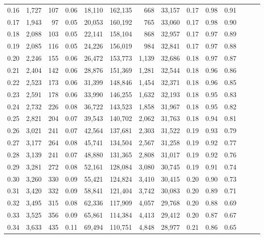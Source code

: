 \begin{tabular}{rrrrrrrrrrrrrr}
0.16 &  1,727 &  107 &  0.06 &   18,110 &  162,135 &     668 &  33,157 &  0.17 &  0.98 &      0.91 \\
0.17 &  1,943 &   97 &  0.05 &   20,053 &  160,192 &     765 &  33,060 &  0.17 &  0.98 &      0.90 \\
0.18 &  2,088 &  103 &  0.05 &   22,141 &  158,104 &     868 &  32,957 &  0.17 &  0.97 &      0.89 \\
0.19 &  2,085 &  116 &  0.05 &   24,226 &  156,019 &     984 &  32,841 &  0.17 &  0.97 &      0.88 \\
0.20 &  2,246 &  155 &  0.06 &   26,472 &  153,773 &   1,139 &  32,686 &  0.18 &  0.97 &      0.87 \\
0.21 &  2,404 &  142 &  0.06 &   28,876 &  151,369 &   1,281 &  32,544 &  0.18 &  0.96 &      0.86 \\
0.22 &  2,523 &  173 &  0.06 &   31,399 &  148,846 &   1,454 &  32,371 &  0.18 &  0.96 &      0.85 \\
0.23 &  2,591 &  178 &  0.06 &   33,990 &  146,255 &   1,632 &  32,193 &  0.18 &  0.95 &      0.83 \\
0.24 &  2,732 &  226 &  0.08 &   36,722 &  143,523 &   1,858 &  31,967 &  0.18 &  0.95 &      0.82 \\
0.25 &  2,821 &  204 &  0.07 &   39,543 &  140,702 &   2,062 &  31,763 &  0.18 &  0.94 &      0.81 \\
0.26 &  3,021 &  241 &  0.07 &   42,564 &  137,681 &   2,303 &  31,522 &  0.19 &  0.93 &      0.79 \\
0.27 &  3,177 &  264 &  0.08 &   45,741 &  134,504 &   2,567 &  31,258 &  0.19 &  0.92 &      0.77 \\
0.28 &  3,139 &  241 &  0.07 &   48,880 &  131,365 &   2,808 &  31,017 &  0.19 &  0.92 &      0.76 \\
0.29 &  3,281 &  272 &  0.08 &   52,161 &  128,084 &   3,080 &  30,745 &  0.19 &  0.91 &      0.74 \\
0.30 &  3,260 &  330 &  0.09 &   55,421 &  124,824 &   3,410 &  30,415 &  0.20 &  0.90 &      0.73 \\
0.31 &  3,420 &  332 &  0.09 &   58,841 &  121,404 &   3,742 &  30,083 &  0.20 &  0.89 &      0.71 \\
0.32 &  3,495 &  315 &  0.08 &   62,336 &  117,909 &   4,057 &  29,768 &  0.20 &  0.88 &      0.69 \\
0.33 &  3,525 &  356 &  0.09 &   65,861 &  114,384 &   4,413 &  29,412 &  0.20 &  0.87 &      0.67 \\
0.34 &  3,633 &  435 &  0.11 &   69,494 &  110,751 &   4,848 &  28,977 &  0.21 &  0.86 &      0.65 \\

\end{tabular}
